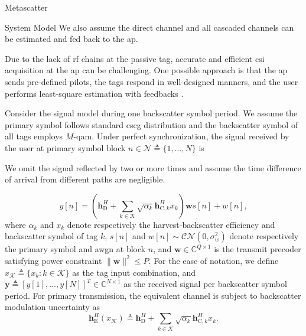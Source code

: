 \documentclass[journal]{IEEEtran}
\begin{document}
\begin{section}{Metascatter}
\begin{subsection}{System Model}
		We also assume the direct channel and all cascaded channels can be estimated and fed back to the \gls{ap}.
		\begin{footnote}
			Due to the lack of \gls{rf} chains at the passive tag, accurate and efficient \gls{csi} acquisition at the \gls{ap} can be challenging.
			One possible approach is that the \gls{ap} sends pre-defined pilots, the tags respond in well-designed manners, and the user performs least-square estimation with feedbacks \cite{Bharadia2015,Yang2015b,Guo2019g}.
		\end{footnote}

		Consider the signal model during one backscatter symbol period.
		We assume the primary symbol follows standard \gls{cscg} distribution and the backscatter symbol of all tags employs $M$-\gls{qam}.
		Under perfect synchronization, the signal received by the user at primary symbol block $n \in \mathcal{N} \triangleq \{1,\ldots,N\}$ is
		\begin{footnote}
			We omit the signal reflected by two or more times\cite{Wu2019} and assume the time difference of arrival from different paths are negligible\cite{Guo2019b}.
		\end{footnote}
		\begin{equation}
			y[n] = \left(\boldsymbol{h}_{\mathrm{D}}^H + \sum_{k \in \mathcal{K}} \sqrt{\alpha_k} \boldsymbol{h}_{\mathrm{C},k}^H x_k\right) \boldsymbol{w} s[n] + w[n],
			\label{eq:received_signal}
		\end{equation}
		where $\alpha_k$ and $x_k$ denote respectively the harvest-backscatter efficiency and backscatter symbol of tag $k$, $s[n]$ and $w[n] \sim \mathcal{CN}(0,\sigma_w^2)$ denote respectively the primary symbol and \gls{awgn} at block $n$, and $\boldsymbol{w} \in \mathbb{C}^{Q \times 1}$ is the transmit precoder satisfying power constraint $\lVert \boldsymbol{w} \rVert^2 \le P$.
		For the ease of notation, we define $x_{\mathcal{K}} \triangleq \{x_k : k \in \mathcal{K}\}$ as the tag input combination, and $\boldsymbol{y} \triangleq \left[y[1],\ldots,y[N]\right]^T \in \mathbb{C}^{N \times 1}$ as the received signal per backscatter symbol period.
		For primary transmission, the equivalent channel is subject to backscatter modulation uncertainty as
		\begin{equation}
			\boldsymbol{h}_{\mathrm{E}}^H(x_{\mathcal{K}}) \triangleq \boldsymbol{h}_{\mathrm{D}}^H + \sum_{k \in \mathcal{K}} \sqrt{\alpha_k} \boldsymbol{h}_{\mathrm{C},k}^H x_k.
			\label{eq:equivalent_channel}
		\end{equation}


\end{subsection}
\end{section}
\end{document}
